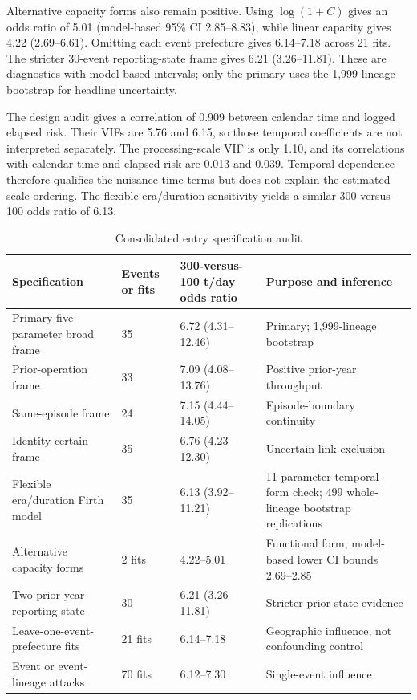 \documentclass[12pt,letterpaper]{article}
\begin{document}
Alternative capacity forms also remain positive. Using $\log(1+C)$ gives an
odds ratio of 5.01 (model-based 95\% CI 2.85--8.83), while linear capacity gives 4.22
(2.69--6.61). Omitting each event prefecture gives 6.14--7.18 across 21 fits.
The stricter 30-event reporting-state frame gives 6.21 (3.26--11.81). These are
diagnostics with model-based intervals; only the primary uses the
1,999-lineage bootstrap for headline uncertainty.

The design audit gives a correlation of 0.909 between calendar time and logged
elapsed risk. Their VIFs are 5.76 and 6.15, so those temporal coefficients are
not interpreted separately. The processing-scale VIF is only 1.10, and its
correlations with calendar time and elapsed risk are 0.013 and 0.039. Temporal
dependence therefore qualifies the nuisance time terms but does not explain the
estimated scale ordering. The flexible era/duration sensitivity yields a
similar 300-versus-100 odds ratio of 6.13.

\begin{table}[!htbp]
\centering
\caption{Consolidated entry specification audit}
\label{tab:entry-specifications}
\scriptsize
\setlength{\tabcolsep}{3.1pt}
\renewcommand{\arraystretch}{1.13}
\begin{tabularx}{\textwidth}{L{3.15cm}R{1.25cm}L{2.45cm}Y}
\toprule
Specification & Events or fits & 300-versus-100 t/day odds ratio & Purpose and inference \\
\midrule
Primary five-parameter broad frame & 35 & 6.72 (4.31--12.46) & Primary;
1,999-lineage bootstrap \\
Prior-operation frame & 33 & 7.09 (4.08--13.76) & Positive prior-year throughput \\
Same-episode frame & 24 & 7.15 (4.44--14.05) & Episode-boundary continuity \\
Identity-certain frame & 35 & 6.76 (4.23--12.30) & Uncertain-link exclusion \\
Flexible era/duration Firth model & 35 & 6.13 (3.92--11.21) & 11-parameter
temporal-form check; 499 whole-lineage bootstrap replications \\
Alternative capacity forms & 2 fits & 4.22--5.01 & Functional form;
model-based lower CI bounds 2.69--2.85 \\
Two-prior-year reporting state & 30 & 6.21 (3.26--11.81) & Stricter prior-state evidence \\
Leave-one-event-prefecture fits & 21 fits & 6.14--7.18 & Geographic influence,
not confounding control \\
Event or event-lineage attacks & 70 fits & 6.12--7.30 & Single-event influence \\
\bottomrule
\end{tabularx}
\renewcommand{\arraystretch}{1}
\normalsize
\end{table}
\end{document}
